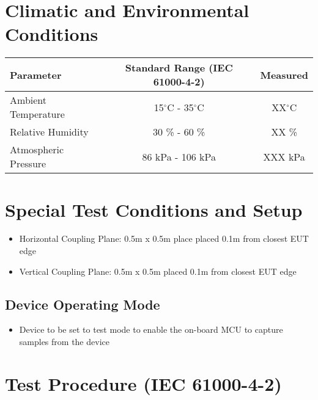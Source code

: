 \documentclass[a4paper,12pt]{article}
\begin{document}
\section{Climatic and Environmental Conditions}

\begin{center} %
\begin{tabular}{|l|c|c|}
  \hline
  \textbf{Parameter} &
  \textbf{Standard Range (IEC 61000-4-2)} &
  \textbf{Measured}\\
  \hline
  Ambient Temperature & 15$^\circ$C - 35$^\circ$C & XX$^\circ$C\\
  Relative Humidity   & 30 \% - 60 \%              & XX \%\\
  Atmospheric Pressure& 86 kPa - 106 kPa           & XXX kPa\\
  \hline
\end{tabular}
\end{center}

\section{Special Test Conditions and Setup}
\begin{itemize}
      \item{Horizontal Coupling Plane: 0.5m x 0.5m place placed 0.1m from closest EUT edge}
      \item{Vertical Coupling Plane: 0.5m x 0.5m placed 0.1m from closest EUT edge}
\end{itemize}

\subsection{Device Operating Mode}
\begin{itemize}
      \item{Device to be set to test mode to enable the on-board MCU to capture samples from the device}
\end{itemize}

\section{Test Procedure (IEC 61000-4-2)}
\end{document}
